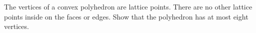 The vertices of a convex polyhedron are lattice points. There are no other lattice points inside on the faces or edges. Show that the polyhedron has at most eight vertices.
